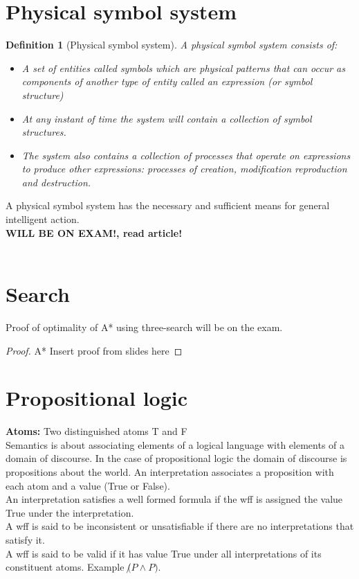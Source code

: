 \documentclass[a4paper]{article}
\newtheorem{definition}{Definition}[section]
\begin{document}
\section{Physical symbol system}
\begin{definition}[Physical symbol system]
  A physical symbol system consists of:
  \begin{itemize}
    \item A set of entities called symbols which are physical patterns that can
      occur as components of another type of entity called an expression (or
      symbol structure)
    \item At any instant of time the system will contain a collection of symbol
      structures.
    \item The system also contains a collection of processes that operate on
      expressions to produce other expressions: processes of creation,
      modification reproduction and destruction.
  \end{itemize}
  
\end{definition}
A physical symbol system has the necessary and sufficient means for general
intelligent action.
\\
\textbf{WILL BE ON EXAM!, read article!}
\\
\\

\section{Search}

Proof of optimality of A* using three-search will be on the exam.

\begin{proof}{A*}
  Insert proof from slides here
\end{proof} 



\section{Propositional logic}
\textbf{Atoms:} Two distinguished atoms T and F\\
Semantics is about associating elements of a logical language with elements of a
domain of discourse. In the case of propositional logic the domain of discourse
is propositions about the world. An interpretation associates a proposition with
each atom and a value (True or False).\\
An interpretation satisfies a well formed formula if the wff is assigned the
value True under the interpretation.\\
A wff is said to be inconsistent or unsatisfiable if there are no
interpretations that satisfy it.\\
A wff is said to be valid if it has value True under all interpretations of its
constituent atoms. Example $\not (P \land P)$.\\
\end{document}
